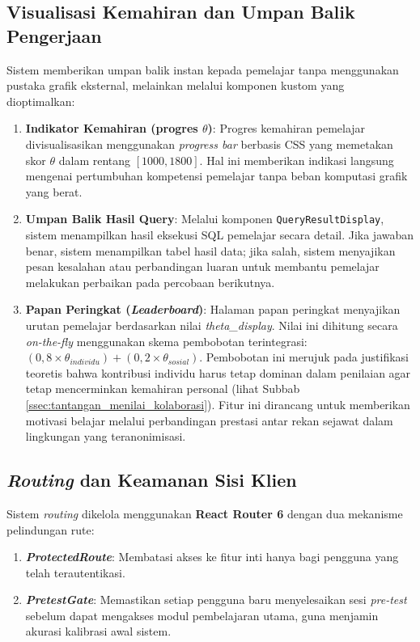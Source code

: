 \subsection{Visualisasi Kemahiran dan Umpan Balik Pengerjaan}
Sistem memberikan umpan balik instan kepada pemelajar tanpa menggunakan pustaka grafik eksternal, melainkan melalui komponen kustom yang dioptimalkan:
\begin{enumerate}
    \item \textbf{Indikator Kemahiran (progres $\theta$)}: Progres kemahiran pemelajar divisualisasikan menggunakan \textit{progress bar} berbasis CSS yang memetakan skor $\theta$ dalam rentang $[1000, 1800]$. Hal ini memberikan indikasi langsung mengenai pertumbuhan kompetensi pemelajar tanpa beban komputasi grafik yang berat.
    \item \textbf{Umpan Balik Hasil Query}: Melalui komponen \texttt{QueryResultDisplay}, sistem menampilkan hasil eksekusi SQL pemelajar secara detail. Jika jawaban benar, sistem menampilkan tabel hasil data; jika salah, sistem menyajikan pesan kesalahan atau perbandingan luaran untuk membantu pemelajar melakukan perbaikan pada percobaan berikutnya.
    \item \textbf{Papan Peringkat (\textit{Leaderboard})}: Halaman papan peringkat menyajikan urutan pemelajar berdasarkan nilai \textit{theta\_display}. Nilai ini dihitung secara \textit{on-the-fly} menggunakan skema pembobotan terintegrasi: $(0,8 \times \theta_{individu}) + (0,2 \times \theta_{sosial})$. Pembobotan ini merujuk pada justifikasi teoretis bahwa kontribusi individu harus tetap dominan dalam penilaian agar tetap mencerminkan kemahiran personal \autocite{Demetroulis2024} (lihat Subbab \ref{ssec:tantangan_menilai_kolaborasi}). Fitur ini dirancang untuk memberikan motivasi belajar melalui perbandingan prestasi antar rekan sejawat dalam lingkungan yang teranonimisasi.
\end{enumerate}

\subsection{\textit{Routing} dan Keamanan Sisi Klien}
Sistem \textit{routing} dikelola menggunakan \textbf{React Router 6} dengan dua mekanisme pelindungan rute:
\begin{enumerate}[1.]
    \item \textbf{\textit{ProtectedRoute}}: Membatasi akses ke fitur inti hanya bagi pengguna yang telah terautentikasi.
    \item \textbf{\textit{PretestGate}}: Memastikan setiap pengguna baru menyelesaikan sesi \textit{pre-test} sebelum dapat mengakses modul pembelajaran utama, guna menjamin akurasi kalibrasi awal sistem.
\end{enumerate}

